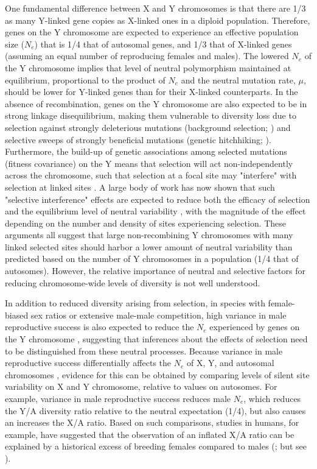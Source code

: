 \documentclass[9pt,twocolumn,twoside,lineno]{gsajnl}
\begin{document}
One fundamental difference between X and Y chromosomes is that there are 1/3 as many Y-linked gene copies as X-linked ones in a diploid population. Therefore, genes on the Y chromosome are expected to experience an effective population size ($N_{e}$) that is 1/4 that of autosomal genes, and 1/3 that of X-linked genes (assuming an equal number of reproducing females and males). The lowered $N_{e}$ of the Y chromosome implies that level of neutral polymorphism maintained at equilibrium, proportional to the product of $N_{e}$ and the neutral mutation rate, $\mu$, should be lower for Y-linked genes than for their X-linked counterparts. In the absence of recombination, genes on the Y chromosome are also expected to be in strong linkage disequilibrium, making them vulnerable to diversity loss due to selection against strongly deleterious mutations (background selection; \citealt{charlesworth1993effect}) and selective sweeps of strongly beneficial mutations (genetic hitchhiking; \citealt{smith1974hitch}). Furthermore, the build-up of genetic associations among selected mutations (fitness covariance) on the Y means that selection will act non-independently across the chromosome, such that selection at a focal site may "interfere" with selection at linked sites \citep{hill1966HReffect}. A large body of work has now shown that such "selective interference" effects are expected to reduce both the efficacy of selection and the equilibrium level of neutral variability \citep{fisher1930genetical, muller1964relation, hill1966HReffect, mcvean2000,KaiserCharlesworth,good2014genetic}, with the magnitude of the effect depending on the number and density of sites experiencing selection. These arguments all suggest that large non-recombining Y chromosomes with many linked selected sites should harbor a lower amount of neutral variability than predicted based on the number of Y chromosomes in a population (1/4 that of autosomes). However, the relative importance of neutral and selective factors for reducing chromosome-wide levels of diversity is not well understood.

In addition to reduced diversity arising from selection, in species with female-biased sex ratios or extensive male-male competition, high variance in male reproductive success is also expected to reduce the $N_{e}$ experienced by genes on the Y chromosome \citep{caballero1995,charlesworth2001,laporte2002,pool2007,ellegren2009}, suggesting that inferences about the effects of selection need to be distinguished from these neutral processes. Because variance in male reproductive success differentially affects the $N_{e}$ of X, Y, and autosomal chromosomes \citep{kimura1964number,nomura2002effective}, evidence for this can be obtained by comparing levels of silent site variability on X and Y chromosome, relative to values on autosomes. For example, variance in male reproductive success reduces male $N_{e}$, which reduces the Y/A diversity ratio relative to the neutral expectation (1/4), but also causes an increases the X/A ratio. Based on such comparisons, studies in humans, for example, have suggested that the observation of an inflated X/A ratio can be explained by a historical excess of breeding females compared to males (\citealt{hammer2008sex}; but see \citealt{bustamante2009,hammer2010,cotter2016genetic}).
\end{document}
